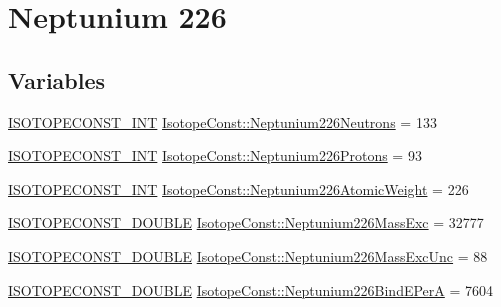 \hypertarget{group___isotope_const-_neptunium-_np226}{}\section{Neptunium 226}
\label{group___isotope_const-_neptunium-_np226}
\subsection*{Variables}
\begin{DoxyCompactItemize}
\item 
\mbox{\hyperlink{group___isotope_const-_macros_ga5f18360b3e99483a35c32d789e62621c}{I\+S\+O\+T\+O\+P\+E\+C\+O\+N\+S\+T\+\_\+\+I\+NT}} \mbox{\hyperlink{group___isotope_const-_neptunium-_np226_gad4b68d6cac86fb47936cca0402c589c8}{Isotope\+Const\+::\+Neptunium226\+Neutrons}} = 133
\item 
\mbox{\hyperlink{group___isotope_const-_macros_ga5f18360b3e99483a35c32d789e62621c}{I\+S\+O\+T\+O\+P\+E\+C\+O\+N\+S\+T\+\_\+\+I\+NT}} \mbox{\hyperlink{group___isotope_const-_neptunium-_np226_gad75fef18d846be9319823bb62a3d40b2}{Isotope\+Const\+::\+Neptunium226\+Protons}} = 93
\item 
\mbox{\hyperlink{group___isotope_const-_macros_ga5f18360b3e99483a35c32d789e62621c}{I\+S\+O\+T\+O\+P\+E\+C\+O\+N\+S\+T\+\_\+\+I\+NT}} \mbox{\hyperlink{group___isotope_const-_neptunium-_np226_gae607e42080ee6815acc600efda2417d9}{Isotope\+Const\+::\+Neptunium226\+Atomic\+Weight}} = 226
\item 
\mbox{\hyperlink{group___isotope_const-_macros_ga8f45a7272ce02c0b4c65c44636ed719a}{I\+S\+O\+T\+O\+P\+E\+C\+O\+N\+S\+T\+\_\+\+D\+O\+U\+B\+LE}} \mbox{\hyperlink{group___isotope_const-_neptunium-_np226_gaa128b05dd53a5f10e3984afd92df7c73}{Isotope\+Const\+::\+Neptunium226\+Mass\+Exc}} = 32777
\item 
\mbox{\hyperlink{group___isotope_const-_macros_ga8f45a7272ce02c0b4c65c44636ed719a}{I\+S\+O\+T\+O\+P\+E\+C\+O\+N\+S\+T\+\_\+\+D\+O\+U\+B\+LE}} \mbox{\hyperlink{group___isotope_const-_neptunium-_np226_ga36b4f1c713d7f2debe0402a0fff45648}{Isotope\+Const\+::\+Neptunium226\+Mass\+Exc\+Unc}} = 88
\item 
\mbox{\hyperlink{group___isotope_const-_macros_ga8f45a7272ce02c0b4c65c44636ed719a}{I\+S\+O\+T\+O\+P\+E\+C\+O\+N\+S\+T\+\_\+\+D\+O\+U\+B\+LE}} \mbox{\hyperlink{group___isotope_const-_neptunium-_np226_gacb5744318b3642a85d05752d7e8b1d99}{Isotope\+Const\+::\+Neptunium226\+Bind\+E\+PerA}} = 7604
\item 

\end{DoxyCompactItemize}
